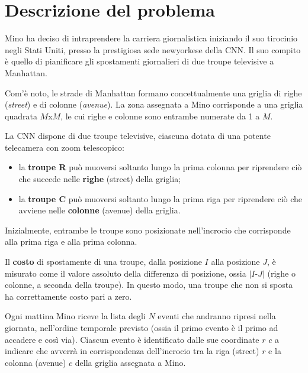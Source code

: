 \documentclass[a4paper,11pt]{article}
\begin{document}
\vspace{0.5cm}



\vspace{0.5cm}

\section*{Descrizione del problema}
  
Mino ha deciso di intraprendere la carriera giornalistica 
iniziando il suo tirocinio negli Stati Uniti, presso la prestigiosa sede
newyorkese della CNN. Il suo compito è quello di pianificare gli
spostamenti giornalieri di due troupe televisive a Manhattan.

Com'è noto, le strade di Manhattan formano concettualmente una
griglia di righe (\emph{street}) e di colonne (\emph{avenue}). La
zona assegnata a Mino corrisponde a una griglia quadrata
$M$x$M$, le cui righe e colonne sono entrambe
numerate da 1 a $M$.

La CNN dispone di due troupe televisive, ciascuna dotata di una
potente telecamera con zoom telescopico:

\begin{itemize}
  
    \item 
la \textbf{troupe R} può muoversi soltanto lungo la
prima colonna per riprendere ciò che succede
nelle \textbf{righe} (street) della griglia;

    \item 
la \textbf{troupe C} può muoversi soltanto lungo la
prima riga per riprendere ciò che avviene nelle
\textbf{colonne} (avenue) della griglia.

\end{itemize}

Inizialmente, entrambe le troupe sono posizionate nell'incrocio che
corrisponde alla prima riga e alla prima colonna.

Il \textbf{costo} di spostamente di una troupe, dalla
posizione $I$ alla posizione $J$, è misurato
come il valore assoluto della differenza di posizione, ossia
$|I$-$J|$ (righe o colonne, a seconda della
troupe). In questo modo, una troupe che non si sposta ha correttamente
costo pari a zero. 

Ogni mattina Mino riceve la lista degli $N$ eventi che
andranno ripresi nella giornata, nell'ordine temporale previsto (ossia
il primo evento è il primo ad accadere e così
via). Ciascun evento è identificato dalle sue coordinate
$r$ $c$ a indicare che avverrà in
corrispondenza dell'incrocio tra la riga (street) $r$ e la
colonna (avenue) $c$ della griglia assegnata a Mino.
\end{document}

